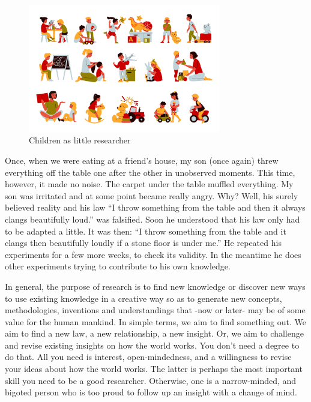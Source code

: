 \documentclass[
  12pt,
  oneside]{book}
\theoremstyle{definition}
\theoremstyle{definition}
\theoremstyle{definition}
\theoremstyle{definition}
\theoremstyle{remark}
\begin{document}
\begin{figure}
\centering
\includegraphics[width=0.75\textwidth,height=\textheight]{fig/2101.i605.022.P.m005.c25.kindergarten set.jpg}
\caption[\label{fig:children} Children as little researcher]{\label{fig:children} Children as little researcher\footnotemark{}}
\end{figure}

Once, when we were eating at a friend's house, my son (once again) threw everything off the table one after the other in unobserved moments. This time, however, it made no noise. The carpet under the table muffled everything. My son was irritated and at some point became really angry. Why? Well, his surely believed reality and his law ``I throw something from the table and then it always clangs beautifully loud.'' was falsified. Soon he understood that his law only had to be adapted a little. It was then: ``I throw something from the table and it clangs then beautifully loudly if a stone floor is under me.'' He repeated his experiments for a few more weeks, to check its validity. In the meantime he does other experiments trying to contribute to his own knowledge.

In general, the purpose of research is to find new knowledge or discover new ways to use existing knowledge in a creative way so as to generate new concepts, methodologies, inventions and understandings that -now or later- may be of some value for the human mankind. In simple terms, we aim to find something out. We aim to find a new law, a new relationship, a new insight. Or, we aim to challenge and revise existing insights on how the world works. You don't need a degree to do that.
All you need is interest, open-mindedness, and a willingness to revise your ideas about how the world works. The latter is perhaps the most important skill you need to be a good researcher. Otherwise, one is a narrow-minded, and bigoted person who is too proud to follow up an insight with a change of mind.
\end{document}
